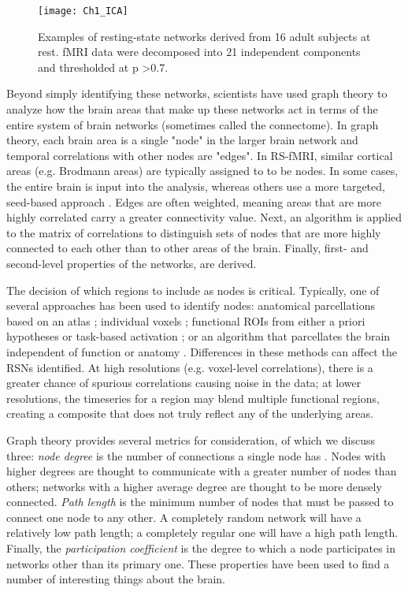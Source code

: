 \begin{figure}[t]
    \centering
    \texttt{[image: Ch1\_ICA]}
    \caption[Examples of resting-state networks.]{Examples of resting-state networks derived from 16 adult subjects at rest. fMRI data were decomposed into 21 independent components and thresholded at p \textgreater 0.7.} 
\end{figure}

Beyond simply identifying these networks, scientists have used graph theory to analyze how the brain areas that make up these networks act in terms of the entire system of brain networks (sometimes called the connectome). In graph theory, each brain area is a single "node" in the larger brain network and temporal correlations with other nodes are "edges". In RS-fMRI, similar cortical areas (e.g. Brodmann areas) are typically assigned to to be nodes. In some cases, the entire brain is input into the analysis, whereas others use a more targeted, seed-based approach \cite{Vogel2010}.  Edges are often weighted, meaning areas that are more highly correlated carry a greater connectivity value. Next, an algorithm is applied to the matrix of correlations to distinguish sets of nodes that are more highly connected to each other than to other areas of the brain. Finally, first- and second-level properties of the networks, are derived.

The decision of which regions to include as nodes is critical. Typically, one of several approaches has been used to identify nodes: anatomical parcellations based on an atlas \cite{Supekar2008, Liu2008, Lynall2010}; individual voxels \cite{Fair2007}; functional ROIs from either a priori hypotheses or task-based activation \cite{VandenHeuvel2010}; or an algorithm that parcellates the brain independent of function or anatomy \cite{Goni2014}.  Differences in these methods can affect the RSNs identified. At high resolutions (e.g. voxel-level correlations), there is a greater chance of spurious correlations causing noise in the data; at lower resolutions, the timeseries for a region may blend multiple functional regions, creating a composite that does not truly reflect any of the underlying areas. 

Graph theory provides several metrics for consideration, of which we discuss three: \textit{node degree} is the number of connections a single node has \cite{Sporns2013}. Nodes with higher degrees are thought to communicate with a greater number of nodes than others; networks with a higher average degree are thought to be more densely connected. \textit{Path length} is the minimum number of nodes that must be passed to connect one node to any other. A completely random network will have a relatively low path length; a completely regular one will have a high path length. Finally, the \textit{participation coefficient} is the degree to which a node participates in networks other than its primary one. These properties have been used to find a number of interesting things about the brain. 

